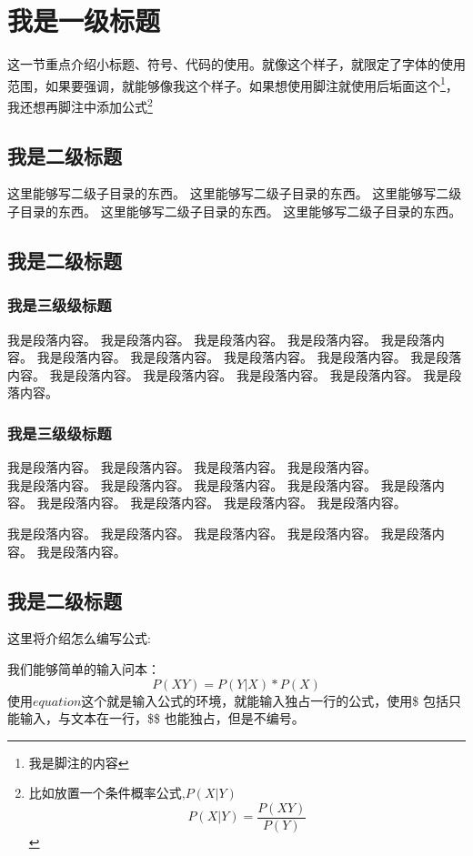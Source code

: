 \documentclass[../document.tex]{subfiles}
\begin{document}
\section{我是一级标题}

{\heiti 这一节重点介绍小标题、符号、代码的使用。}就像这个样子，就限定了字体的使用范围，如果要强调，就能够像我这个样子。如果想使用脚注就使用后垢面这个\footnote{我是脚注的内容}， 我还想再脚注中添加公式\footnote{
比如放置一个条件概率公式,$P(X|Y)$
$$P(X|Y) = \frac{P(XY)}{P(Y)}$$
}

\subsection{我是二级标题}
这里能够写二级子目录的东西。
这里能够写二级子目录的东西。
这里能够写二级子目录的东西。
这里能够写二级子目录的东西。
这里能够写二级子目录的东西。

\subsection{我是二级标题}
\subsubsection{我是三级级标题}

我是段落内容。
我是段落内容。
我是段落内容。
我是段落内容。
我是段落内容。
我是段落内容。
我是段落内容。
我是段落内容。
我是段落内容。
我是段落内容。
我是段落内容。
我是段落内容。
我是段落内容。
我是段落内容。
我是段落内容。

\subsubsection{我是三级级标题}
我是段落内容。
我是段落内容。
我是段落内容。
我是段落内容。\\
我是段落内容。
我是段落内容。
我是段落内容。
我是段落内容。
我是段落内容。
我是段落内容。
我是段落内容。
我是段落内容。
我是段落内容。

我是段落内容。
我是段落内容。
我是段落内容。
我是段落内容。
我是段落内容。
我是段落内容。

\subsection{我是二级标题}
这里将介绍怎么编写公式:

我们能够简单的输入问本：
\begin{equation}
	P(XY) = P(Y|X) * P(X)
	\label{eq:乘法公式} 
\end{equation}
使用$equation$这个就是输入公式的环境，就能输入独占一行的公式，使用\$ 包括只能输入，与文本在一行，\$\$ 也能独占，但是不编号。
\end{document}
